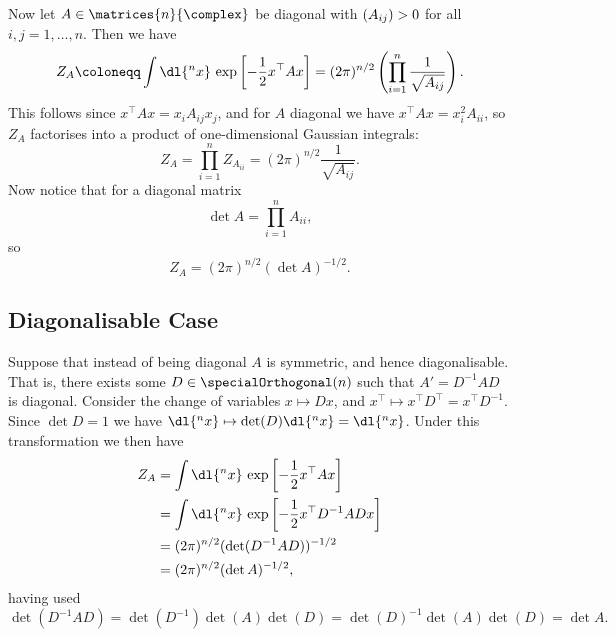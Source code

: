 \documentclass[fleqn]{NotesClass}
\let\Re\relax
\DeclareMathOperator{\Re}{Re}
\newcommand{\trans}{{\top}}
\begin{document}
    Now let \(A \in \matrices{n}{\complex}\) be diagonal with \(\Re(A_{ij}) > 0\) for all \(i, j = 1, \dotsc, n\).
    Then we have
    \begin{equation}
        Z_A \coloneqq \int \dl{^nx} \, \exp\left[ -\frac{1}{2}x^\trans A x \right] = (2\pi)^{n/2} \left( \prod_{i=1}^{n} \frac{1}{\sqrt{A_{ij}}} \right).
    \end{equation}
    This follows since \(x^\trans Ax = x_iA_{ij}x_j\), and for \(A\) diagonal we have \(x^\trans Ax = x_i^2A_{ii}\), so \(Z_A\) factorises into a product of one-dimensional Gaussian integrals:
    \begin{equation}
        Z_A = \prod_{i = 1}^{n} Z_{A_{ii}} = (2\pi)^{n/2} \frac{1}{\sqrt{A_{ij}}}.
    \end{equation}
    Now notice that for a diagonal matrix
    \begin{equation}
        \det A = \prod_{i = 1}^{n} A_{ii},
    \end{equation}
    so
    \begin{equation}
        Z_A = (2\pi)^{n/2} (\det A)^{-1/2}.
    \end{equation}
    
    \subsection{Diagonalisable Case}
    Suppose that instead of being diagonal \(A\) is symmetric, and hence diagonalisable.
    That is, there exists some \(D \in \specialOrthogonal(n)\) such that \(A' = D^{-1}AD\) is diagonal.
    Consider the change of variables \(x \mapsto Dx\), and \(x^\trans \mapsto x^\trans D^\trans = x^{\trans}D^{-1}\).
    Since \(\det D = 1\) we have \(\dl{^nx} \mapsto \det(D) \dl{^nx} = \dl{^nx}\).
    Under this transformation we then have
    \begin{align}
        Z_A &= \int \dl{^nx} \, \exp\left[ -\frac{1}{2}x^\trans Ax \right]\\
        &= \int \dl{^nx} \, \exp\left[ -\frac{1}{2}x^\trans D^{-1}ADx \right]\\
        &= (2\pi)^{n/2}(\det(D^{-1}AD))^{-1/2}\\
        &= (2\pi)^{n/2} (\det A)^{-1/2},
    \end{align}
    having used
    \begin{equation*}
        \det(D^{-1}AD) = \det(D^{-1})\det(A)\det(D) = \det(D)^{-1}\det(A)\det(D) = \det A.
    \end{equation*}
    
\end{document}
